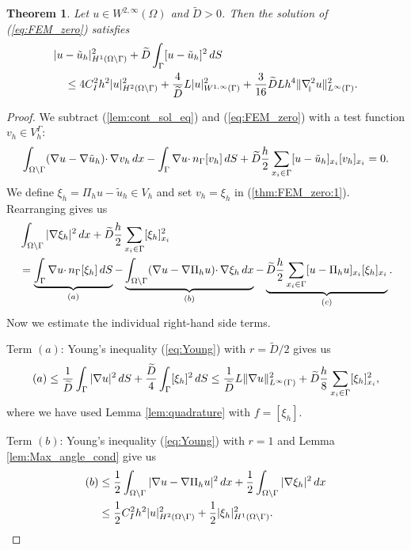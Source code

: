 \documentclass{article}
\newtheorem{theorem}[lemma]{Theorem}
\theoremstyle{remark}
\def \d {{\rm d}}
\def\dx{\,\d x }
\def\dS{\,\d S }
\def\WIi{W^{1,\infty}}
\def\WIIi{W^{2,\infty}}
\def\tu{\tilde{u}}
\def\gradt{\nabla_{\!\!{\scriptscriptstyle\parallel}}}
\def\tD{\widetilde{D}}
\begin{document}
\begin{theorem}
\label{thm:FEM_zero}
Let $u\in \WIIi(\Omega)$ and $\tD>0$. Then the solution of (\ref{eq:FEM_zero}) satisfies
\begin{equation}
\begin{split}
\label{thm:FEM_zero:est}
&|u-\tu_h|^2_{H^1(\Omega\setminus\Gamma)} +\tD\int_{\Gamma}[u-\tu_h]^2\dS \\
&\quad\leq 4C_I^2h^2|u|^2_{H^2(\Omega\setminus\Gamma)} + \frac{4}{\tD}L |u|_{\WIi(\Gamma)}^2 +\frac{3}{16}\tD L h^4 \|\gradt^2 u\|^2_{L^\infty(\Gamma)}.
\end{split}
\end{equation}
\end{theorem}
\begin{proof}
We subtract (\ref{lem:cont_sol_eq}) and (\ref{eq:FEM_zero}) with a test function $v_h\in V_h^\Gamma$:
\begin{equation}
\label{thm:FEM_zero:1}
\int_{\Omega\setminus\Gamma}(\nabla u-\nabla\tu_h)\cdotp\nabla v_h \dx -\int_\Gamma\nabla u\cdotp n_\Gamma[v_h]\dS +\tD\frac{h}{2}\sum_{x_i\in\Gamma}[u-\tu_h]_{x_i}[v_h]_{x_i} =0.
\end{equation}
We define $\xi_h=\Pi_h u-\tu_h\in V_h$ and set $v_h=\xi_h$ in (\ref{thm:FEM_zero:1}). Rearranging gives us
\begin{equation}
\label{thm:FEM_zero:3}
\begin{split}
&\int_{\Omega\setminus\Gamma} |\nabla \xi_h|^2\dx +\tD\frac{h}{2}\sum_{x_i\in\Gamma}[\xi_h]_{x_i}^2\\
&= \underbrace{\int_\Gamma\nabla u\cdotp n_\Gamma[\xi_h]\dS}_{(a)}  -\underbrace{\int_{\Omega\setminus\Gamma}(\nabla u-\nabla\Pi_h u)\cdotp\nabla \xi_h \dx}_{(b)} -\underbrace{\tD\frac{h}{2}\sum_{x_i\in\Gamma}[u-\Pi_h u]_{x_i}[\xi_h]_{x_i}}_{(c)}.
\end{split}
\end{equation}
Now we estimate the individual right-hand side terms.

Term $(a)$: Young's inequality (\ref{eq:Young}) with $r=\tD/2$ gives us
\begin{equation}
\label{thm:FEM_zero:4}
(a)\leq \frac{1}{\tD}\int_\Gamma|\nabla u|^2\dS +\frac{\tD}{4}\int_\Gamma[\xi_h]^2\dS \leq \frac{1}{\tD}L\|\nabla u\|^2_{L^\infty(\Gamma)} +\tD\frac{h}{8}\sum_{x_i\in\Gamma}[\xi_h]_{x_i}^2,
\end{equation}
where we have used Lemma \ref{lem:quadrature} with $f=[\xi_h]$. 

Term $(b)$: Young's inequality (\ref{eq:Young}) with $r=1$ and Lemma \ref{lem:Max_angle_cond} give us
\begin{equation}
\begin{split}
\label{thm:FEM_zero:4a}
(b)&\leq \frac{1}{2}\int_{\Omega\setminus\Gamma}|\nabla u-\nabla\Pi_h u|^2 \dx +\frac{1}{2}\int_{\Omega\setminus\Gamma}|\nabla \xi_h|^2 \dx\\ &\leq \frac{1}{2}C_I^2h^2|u|^2_{H^2(\Omega\setminus\Gamma)} +\frac{1}{2}|\xi_h|_{H^1(\Omega\setminus\Gamma)}^2.
\end{split}
\end{equation}


\end{proof}
\end{document}
